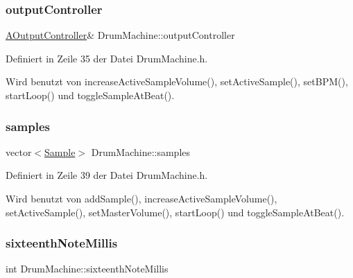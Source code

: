 \subsubsection{\texorpdfstring{output\+Controller}{outputController}}
{\footnotesize\ttfamily \hyperlink{class_a_output_controller}{A\+Output\+Controller}\& Drum\+Machine\+::output\+Controller\hspace{0.3cm}{\ttfamily [private]}}



Definiert in Zeile 35 der Datei Drum\+Machine.\+h.



Wird benutzt von increase\+Active\+Sample\+Volume(), set\+Active\+Sample(), set\+B\+P\+M(), start\+Loop() und toggle\+Sample\+At\+Beat().

\mbox{\label{class_drum_machine_acf215ead70c41e760556497281aa562e}} 
\subsubsection{\texorpdfstring{samples}{samples}}
{\footnotesize\ttfamily vector$<$\hyperlink{class_sample}{Sample}$>$ Drum\+Machine\+::samples\hspace{0.3cm}{\ttfamily [private]}}



Definiert in Zeile 39 der Datei Drum\+Machine.\+h.



Wird benutzt von add\+Sample(), increase\+Active\+Sample\+Volume(), set\+Active\+Sample(), set\+Master\+Volume(), start\+Loop() und toggle\+Sample\+At\+Beat().

\mbox{\label{class_drum_machine_a55ad96f0aa2452d631e49bcdde9fd538}} 
\subsubsection{\texorpdfstring{sixteenth\+Note\+Millis}{sixteenthNoteMillis}}
{\footnotesize\ttfamily int Drum\+Machine\+::sixteenth\+Note\+Millis\hspace{0.3cm}{\ttfamily [private]}}



